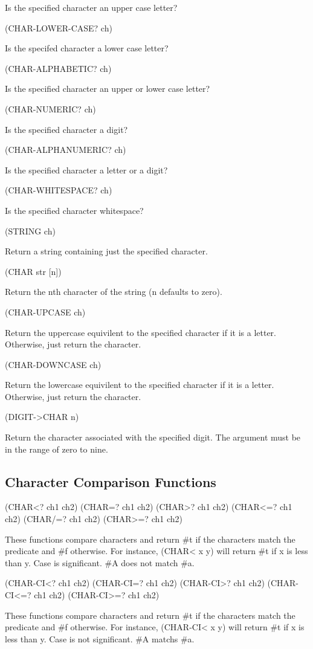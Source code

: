 \documentclass[11pt]{article}
\begin{document}
Is the specified character an upper case letter?

(CHAR-LOWER-CASE? ch)

Is the specifed character a lower case letter?

(CHAR-ALPHABETIC? ch)

Is the specified character an upper or lower case letter?

(CHAR-NUMERIC? ch)

Is the specified character a digit?

(CHAR-ALPHANUMERIC? ch)

Is the specified character a letter or a digit?

(CHAR-WHITESPACE? ch)

Is the specified character whitespace?

(STRING ch)

Return a string containing just the specified character.

(CHAR str [n])

Return the nth character of the string (n defaults to zero).

(CHAR-UPCASE ch)

Return the uppercase equivilent to the specified character if it is a
letter.  Otherwise, just return the character.

(CHAR-DOWNCASE ch)

Return the lowercase equivilent to the specified character if it is a
letter.  Otherwise, just return the character.

(DIGIT->CHAR n)

Return the character associated with the specified digit.  The argument
must be in the range of zero to nine.
\subsection{Character Comparison Functions}
\label{sec-1-33}

(CHAR<? ch1 ch2)
(CHAR=? ch1 ch2)
(CHAR>? ch1 ch2)
(CHAR<=? ch1 ch2)
(CHAR/=? ch1 ch2)
(CHAR>=? ch1 ch2)

These functions compare characters and return \#t if the characters match
the predicate and \#f otherwise. For instance, (CHAR< x y) will return \#t
if x is less than y. Case is significant. \#A does not match \#a.

(CHAR-CI<? ch1 ch2)
(CHAR-CI=? ch1 ch2)
(CHAR-CI>? ch1 ch2)
(CHAR-CI<=? ch1 ch2)
(CHAR-CI>=? ch1 ch2)

These functions compare characters and return \#t if the characters match
the predicate and \#f otherwise. For instance, (CHAR-CI< x y) will
return \#t if x is less than y. Case is not significant. \#A matchs \#a.
\end{document}
